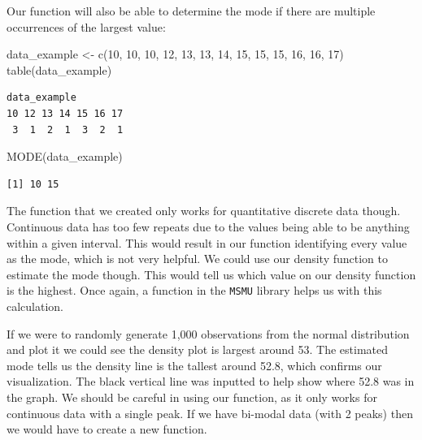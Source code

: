 \documentclass[
  letterpaper,
  DIV=11,
  numbers=noendperiod]{scrreprt}
\newenvironment{Shaded}{\begin{snugshade}}{\end{snugshade}}
\newcommand{\DecValTok}[1]{\textcolor[rgb]{0.68,0.00,0.00}{#1}}
\newcommand{\FunctionTok}[1]{\textcolor[rgb]{0.28,0.35,0.67}{#1}}
\newcommand{\NormalTok}[1]{\textcolor[rgb]{0.00,0.23,0.31}{#1}}
\newcommand{\OtherTok}[1]{\textcolor[rgb]{0.00,0.23,0.31}{#1}}
\begin{document}
Our function will also be able to determine the mode if there are
multiple occurrences of the largest value:

\begin{Shaded}
\begin{Highlighting}[]
\NormalTok{data\_example }\OtherTok{\textless{}{-}} \FunctionTok{c}\NormalTok{(}\DecValTok{10}\NormalTok{, }\DecValTok{10}\NormalTok{, }\DecValTok{10}\NormalTok{, }\DecValTok{12}\NormalTok{, }\DecValTok{13}\NormalTok{, }\DecValTok{13}\NormalTok{, }\DecValTok{14}\NormalTok{, }\DecValTok{15}\NormalTok{, }\DecValTok{15}\NormalTok{, }\DecValTok{15}\NormalTok{, }\DecValTok{16}\NormalTok{, }\DecValTok{16}\NormalTok{, }\DecValTok{17}\NormalTok{)}
\FunctionTok{table}\NormalTok{(data\_example)}
\end{Highlighting}
\end{Shaded}

\begin{verbatim}
data_example
10 12 13 14 15 16 17 
 3  1  2  1  3  2  1 
\end{verbatim}

\begin{Shaded}
\begin{Highlighting}[]
\FunctionTok{MODE}\NormalTok{(data\_example)}
\end{Highlighting}
\end{Shaded}

\begin{verbatim}
[1] 10 15
\end{verbatim}

The function that we created only works for quantitative discrete data
though. Continuous data has too few repeats due to the values being able
to be anything within a given interval. This would result in our
function identifying every value as the mode, which is not very helpful.
We could use our density function to estimate the mode though. This
would tell us which value on our density function is the highest. Once
again, a function in the \texttt{MSMU} library helps us with this
calculation.

If we were to randomly generate 1,000 observations from the normal
distribution and plot it we could see the density plot is largest around
53. The estimated mode tells us the density line is the tallest around
52.8, which confirms our visualization. The black vertical line was
inputted to help show where 52.8 was in the graph. We should be careful
in using our function, as it only works for continuous data with a
single peak. If we have bi-modal data (with 2 peaks) then we would have
to create a new function.
\end{document}

